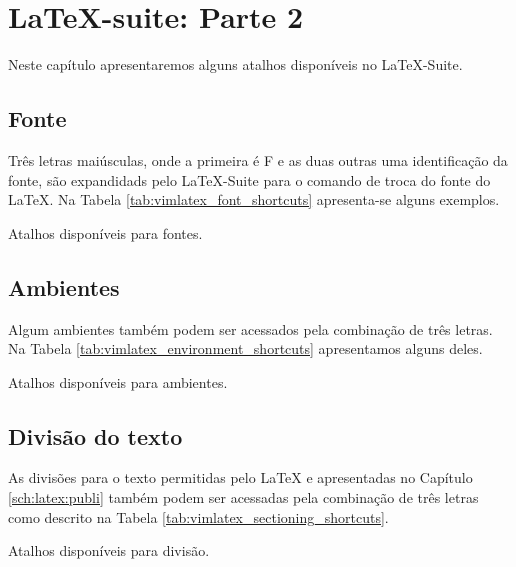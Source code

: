 % 
% 
% 
% 
% 
\chapter{LaTeX-suite: Parte 2} \label{V:LaTeX2}
Neste capítulo apresentaremos alguns atalhos disponíveis no LaTeX-Suite.

\section{Fonte}
Três letras maiúsculas, onde a primeira é \textsf{F} e as duas outras uma identificação da fonte, são expandidads pelo LaTeX-Suite para o comando de troca do fonte do LaTeX. Na Tabela \ref{tab:vimlatex_font_shortcuts} apresenta-se alguns exemplos. 

\begin{table}[h!tb]
    \centering
    \caption{Atalhos disponíveis para fontes.}
    \label{tab:vimlatex_font_shortcuts}
    
\end{table}

\section{Ambientes}
Algum ambientes também podem ser acessados pela combinação de três letras. Na Tabela \ref{tab:vimlatex_environment_shortcuts} apresentamos alguns deles.
\begin{table}[h!tb]
    \centering
    \caption{Atalhos disponíveis para ambientes.}
    \label{tab:vimlatex_environment_shortcuts}
    
\end{table}

\section{Divisão do texto}
As divisões para o texto permitidas pelo LaTeX e apresentadas no Capítulo \ref{sch:latex:publi} também podem ser acessadas pela combinação de três letras como descrito na Tabela \ref{tab:vimlatex_sectioning_shortcuts}.
\begin{table}[h!tb]
    \centering
    \caption{Atalhos disponíveis para divisão.}
    \label{tab:vimlatex_sectioning_shortcuts}
    
\end{table}

